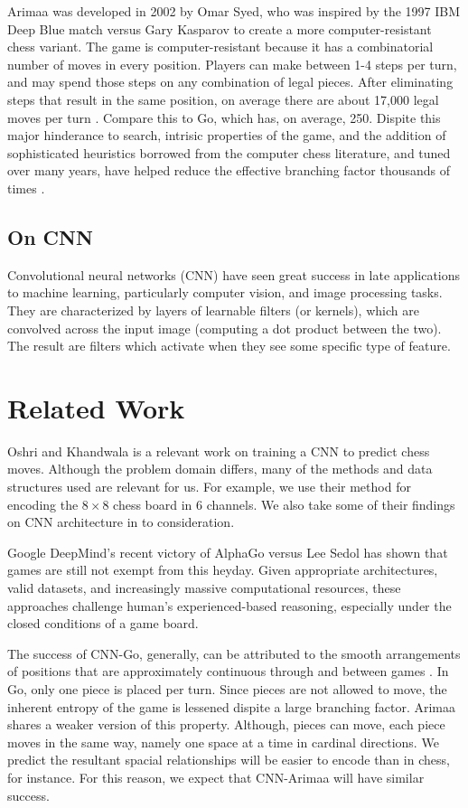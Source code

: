\documentclass{article}
\begin{document}
Arimaa was developed in 2002 by Omar Syed, who was inspired by the 1997 IBM Deep Blue match versus Gary Kasparov to create a more computer-resistant chess variant.  The game is computer-resistant because it has a combinatorial number of moves in every position.  Players can make between 1-4 steps per turn, and may spend those steps on any combination of legal pieces.  After eliminating steps that result in the same position, on average there are about 17,000 legal moves per turn \cite{haskin}.  Compare this to Go, which has, on average, 250.  Dispite this major hinderance to search, intrisic properties of the game, and the addition of sophisticated heuristics borrowed from the computer chess literature, and tuned over many years, have helped reduce the effective branching factor thousands of times \cite{wu}.

\subsection{On CNN}

Convolutional neural networks (CNN) have seen great success in late applications to machine learning, particularly computer vision, and image processing tasks.  They are characterized by layers of learnable filters (or kernels), which are convolved across the input image (computing a dot product between the two).  The result are filters which activate when they see some specific type of feature.  

\section{Related Work}

Oshri and Khandwala \cite{Oshri_Khandwala} is a relevant work on training a CNN to predict chess moves.  Although the problem domain differs, many of the methods and data structures used are relevant for us.  For example, we use their method for encoding the $8\times 8$ chess board in 6 channels.  We also take some of their findings on CNN architecture in to consideration.

Google DeepMind's recent victory of AlphaGo versus Lee Sedol has shown that games are still not exempt from this heyday.  Given appropriate architectures, valid datasets, and increasingly massive computational resources, these approaches challenge human's experienced-based reasoning, especially under the closed conditions of a game board.

The success of CNN-Go, generally, can be attributed to the smooth arrangements of positions that are approximately continuous through and between games \cite{Oshri_Khandwala}.  In Go, only one piece is placed per turn.  Since pieces are not allowed to move, the inherent entropy of the game is lessened dispite a large branching factor.  Arimaa shares a weaker version of this property.  Although, pieces can move, each piece moves in the same way, namely one space at a time in cardinal directions.  We predict the resultant spacial relationships will be easier to encode than in chess, for instance.  For this reason, we expect that CNN-Arimaa will have similar success.
\end{document}
